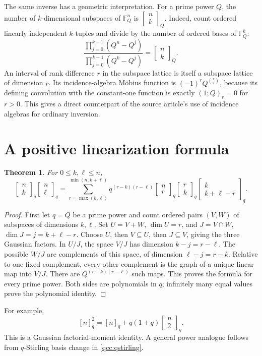 \documentclass[11pt,a4paper,oneside,openany]{book}
\newtheorem{theorem}{Theorem}[chapter]
\theoremstyle{definition}
\theoremstyle{remark}
\newcommand{\F}{\mathbb F}
\newcommand{\GB}[3][q]{\begin{bmatrix}#2\\#3\end{bmatrix}_{#1}}
\newcommand{\qi}[2][q]{[#2]_{#1}}
\begin{document}
The same inverse has a geometric interpretation. For a prime power \(Q\), the
number of \(k\)-dimensional subspaces of \(\F_Q^n\) is \(\GB[Q]nk\).
Indeed, count ordered linearly independent \(k\)-tuples and divide by the number
of ordered bases of \(\F_Q^k\):
\[
 \frac{\prod_{j=0}^{k-1}(Q^n-Q^j)}{\prod_{j=0}^{k-1}(Q^k-Q^j)}=\GB[Q]nk.
\]
An interval of rank difference \(r\) in the subspace lattice is itself a
subspace lattice of dimension \(r\). Its incidence-algebra M\"obius function is
\((-1)^rQ^{\binom r2}\), because its defining convolution with the constant-one
function is exactly \((1;Q)_r=0\) for \(r>0\). This gives a direct counterpart
of the source article's use of incidence algebras for ordinary inversion.

\section{A positive linearization formula}
\begin{theorem}\label{qcc:linearization}
For \(0\le k,\ell\le n\),
\begin{equation}\label{qcc:linearization-formula}
 \GB nk\GB n\ell
 =\sum_{r=\max(k,\ell)}^{\min(n,k+\ell)}
 q^{(r-k)(r-\ell)}\GB nr\GB rk\GB k{k+\ell-r}.
\end{equation}
\end{theorem}
\begin{proof}
First let \(q=Q\) be a prime power and count ordered pairs \((V,W)\) of
subspaces of dimensions \(k,\ell\). Set \(U=V+W\), \(\dim U=r\), and
\(J=V\cap W\), \(\dim J=j=k+\ell-r\). Choose \(U\), then \(V\subseteq U\),
then \(J\subseteq V\), giving the three Gaussian factors.
In \(U/J\), the space \(V/J\) has dimension \(k-j=r-\ell\).
The possible \(W/J\) are complements of this space, of dimension
\(\ell-j=r-k\). Relative to one fixed complement, every other complement is
the graph of a unique linear map into \(V/J\). There are
\(Q^{(r-k)(r-\ell)}\) such maps. This proves the formula for every prime power.
Both sides are polynomials in \(q\); infinitely many equal values prove the
polynomial identity.
\end{proof}
For example,
\begin{equation}\label{qcc:qinteger-square}
 \qi n^2=\qi n+q(1+q)\GB n2.
\end{equation}
This is a Gaussian factorial-moment identity. A general power analogue follows
from \(q\)-Stirling basis change in \cref{qcc:qstirling}.
\end{document}
